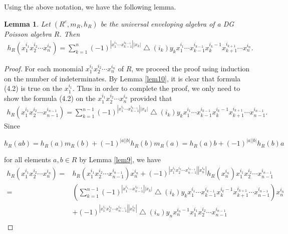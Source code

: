 \documentclass[a4paper,10pt]{amsart}
\newtheorem{lemma}[theorem]{Lemma}
\theoremstyle{definition}
\theoremstyle{remark}
\numberwithin{equation}{section}
\begin{document}
Using the above notation, we have the following lemma.
\begin{lemma}\label{lem11}
Let $(R^{e}, m_R, h_R)$ be the universal enveloping algebra of a DG
Poisson algebra $R$. Then
\begin{equation}
\begin{split}
h_R(x_1^{i_1}x_2^{i_2}\cdots x_n^{i_n})=\sum_{k=1}^n(-1)^{|x_1^{i_1}\cdots x_{k-1}^{i_{k-1}}||x_k|}\bigtriangleup(i_k)y_kx_1^{i_1}\cdots x_{k-1}^{i_{k-1}}x_k^{i_k-1}x_{k+1}^{i_{k+1}}\cdots x_n^{i_n}.
\end{split}
\end{equation}
\end{lemma}

\begin{proof}
For each monomial $x_1^{i_1}x_2^{i_2}\cdots x_n^{i_n}$ of $R$, we proceed the
proof using induction on the number of indeterminates. By
Lemma \ref{lem10}, it is clear that formula (4.2) is true on the
$x_1^{i_1}$. Thus in order to complete the proof, we only need to
show the formula (4.2) on the $x_1^{i_1}x_2^{i_2}\cdots x_n^{i_n}$ provided
that
\begin{equation}
\begin{split}
h_R(x_1^{i_1}x_2^{i_2}\cdots x_{n-1}^{i_{n-1}})=\sum_{k=1}^{n-1}(-1)^{|x_1^{i_1}\cdots x_{k-1}^{i_{k-1}}||x_k|}\bigtriangleup(i_k)y_kx_1^{i_1}\cdots x_{k-1}^{i_{k-1}}x_k^{i_k-1}x_{k+1}^{i_{k+1}}\cdots x_{n-1}^{i_{n-1}}.
\end{split}\nonumber
\end{equation}
Since
\begin{center}
$h_R(ab)=h_R(a)m_R(b)+(-1)^{|a||b|}h_R(b)m_R(a)=h_R(a)b+(-1)^{|a||b|}h_R(b)a$
\end{center}
for all elements $a, b\in R$ by Lemma \ref{lem9}, we have
\begin{equation}
\begin{split}
h_R(x_1^{i_1}x_2^{i_2}\cdots x_n^{i_n})=&h_R(x_1^{i_1}x_2^{i_2}\cdots x_{n-1}^{i_{n-1}})x_n^{i_n}
+(-1)^{|x_1^{i_1}x_2^{i_2}\cdots x_{n-1}^{i_{n-1}}||x_n^{i_n}|}h_R(x_n^{i_n})x_1^{i_1}x_2^{i_2}\cdots x_{n-1}^{i_{n-1}}\\
=&(\sum_{k=1}^{n-1}(-1)^{|x_1^{i_1}\cdots x_{k-1}^{i_{k-1}}||x_k|}\bigtriangleup(i_k)y_kx_1^{i_1}\cdots
x_{k-1}^{i_{k-1}}x_k^{i_k-1}x_{k+1}^{i_{k+1}}\cdots x_{n-1}^{i_{n-1}})x_n^{i_n}\\
&+(-1)^{|x_1^{i_1}x_2^{i_2}\cdots x_{n-1}^{i_{n-1}}||x_n^{i_n}|}\bigtriangleup
(i_n)y_nx_n^{i_n-1}x_1^{i_1}x_2^{i_2}\cdots x_{n-1}^{i_{n-1}}\\

\end{split}
\end{equation}
\end{proof}
\end{document}
